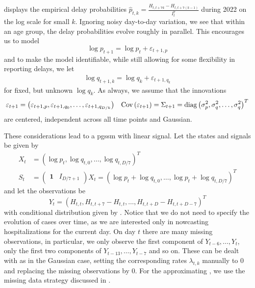  displays the empirical delay probabilities $\hat p_{t,k} = \frac{H_{t, t + 7k} - H_{t,t + 7 (k - 1)}}{I^{7}_t}$ during 2022 on the log scale for small $k$. Ignoring noisy day-to-day variation, we see that within an age group, the delay probabilities evolve roughly in parallel. 
This encourages us to model 
$$
    \log p^{}_{t + 1} = \log p^{}_t + \varepsilon_{t + 1, p}
$$
and to make the model identifiable, while still allowing for some flexibility in reporting delays, we let 
\begin{align*}
    \log q_{t+1, k} = \log q_{k} + \varepsilon_{t+1, q_{k}}  
\end{align*}
for fixed, but unknown $\log q_k$. As always, we assume that the innovations 
\begin{align*}
    \varepsilon_{t + 1} = \left( \varepsilon_{t + 1, p}, \varepsilon_{t + 1, q_{0}}, \dots, \varepsilon_{t + 1, q_{D / k}}  \right) && \operatorname{Cov} \left( \varepsilon_{t + 1 } \right) = \Sigma_{t + 1} = \operatorname{diag} \left( \sigma^{2}_p, \sigma^2_{q}, \dots, \sigma^{2}_q \right)^{T}
\end{align*} are centered, independent across all time points and Gaussian.

These considerations lead to a \acrshort{pgssm} with linear signal. Let the states and signals be given by 
\begin{align*}
   X_{t} &= \left( \log p_{t}, \log q_{t,0}, \dots, \log q_{t, D / 7} \right) ^{T} \\
   S_{t} &= \begin{pmatrix}
    \mathbf 1 & I_{D / 7 + 1}
   \end{pmatrix} X_{t} = \left( \log p_{t} + \log q_{t,0}, \dots, \log p_{t} + \log q_{t, D / 7} \right)^{T}
\end{align*}
and let the observations be 
$$
    Y_{t} = \left( H_{t,t},  H_{t, t + 7} - H^{}_{t, t} , \dots, H_{t, t + D} - H^{}_{t, t + D - 7}\right)^{T}
$$
with conditional distribution given by .
Notice that we do not need to specify the evolution of cases over time, as we are interested only in nowcasting hospitalizations for the current day. 
On day $t$ there are many missing observations, in particular, we only observe the first component of $Y_{t - 6}, \dots, Y_{t}$, only the first two components of $Y_{t - 13}, \dots, Y_{t-7}$ and so on. These can be dealt with as in the Gaussian case, setting the corresponding rates $\lambda_{t,k}$ manually to $0$ and replacing the missing observations by $0$. For the approximating , we use the missing data strategy discussed in .

